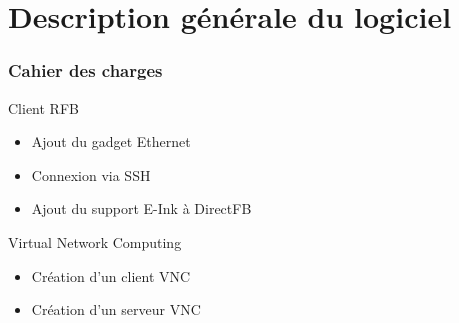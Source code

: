 \section[Description]{Description générale du logiciel}



\begin{frame}

 \frametitle{Cahier des charges}


%






%




%
%
%
%


\begin{block}{Client RFB}
\begin{itemize}
\item Ajout du gadget Ethernet
\item Connexion via SSH
\item Ajout du support E-Ink à DirectFB
\end{itemize}
\end{block}

\begin{block}{Virtual Network Computing}
\begin{itemize}
\item Création d'un client VNC
\item Création d'un serveur VNC
\end{itemize}
\end{block}


\end{frame}


